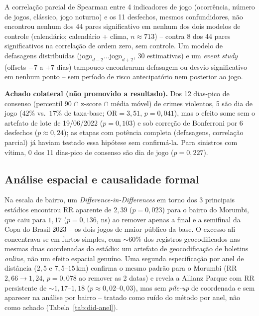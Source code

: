 \documentclass[12pt]{article}
\begin{document}
A correlação parcial de Spearman entre 4 indicadores de jogo (ocorrência,
número de jogos, clássico, jogo noturno) e os 11 desfechos, mesmos
confundidores, não encontrou nenhum dos 44 pares significativo em nenhum
dos dois modelos de controle (calendário; calendário + clima,
$n\approx713$) -- contra 8 dos 44 pares significativos na correlação de
ordem zero, sem controle. Um modelo de defasagens distribuídas
($\text{jogo}_{d-2}\ldots\text{jogo}_{d+2}$, 30 estimativas) e um
\emph{event study} (offsets $-7$ a $+7$ dias) tampouco encontraram
defasagem ou desvio significativo em nenhum ponto -- sem período de risco
antecipatório nem posterior ao jogo.

\textbf{Achado colateral (não promovido a resultado).} Dos 12 dias-pico de
consenso (percentil 90 $\cap$ z-score $\cap$ média móvel) de crimes
violentos, 5 são dia de jogo ($42\%$ vs.\ $17\%$ de taxa-base;
$\text{OR}=3,51$, $p=0,041$), mas o efeito some sem o artefato de lote de
19/06/2022 ($p=0,103$) e sob correção de Bonferroni por 6 desfechos
($p\approx0,24$); as etapas com potência completa (defasagens, correlação
parcial) já haviam testado essa hipótese sem confirmá-la. Para sinistros
com vítima, 0 dos 11 dias-pico de consenso são dia de jogo ($p=0,227$).

\subsection{Análise espacial e causalidade formal}

Na escala de bairro, um \emph{Difference-in-Differences} em torno dos 3
principais estádios encontrou RR aparente de $2,39$ ($p=0,023$) para o
bairro do Morumbi, que caiu para $1,17$ ($p=0,136$, ns) ao remover apenas
a final e a semifinal da Copa do Brasil 2023 -- os dois jogos de maior
público da base. O excesso ali concentrava-se em furtos simples, com
$\sim$60\% dos registros geocodificados nas mesmas duas coordenadas do
estádio: um artefato de geocodificação de boletins \emph{online}, não um
efeito espacial genuíno. Uma segunda especificação por anel de distância
($2,5$ e $7,5$--$15$\,km) confirma o mesmo padrão para o Morumbi (RR
$2,66\rightarrow1,24$, $p=0,078$ ao remover as 2 datas) e revela a Allianz
Parque com RR persistente de $\sim$$1,17$--$1,18$
($p\approx0,02$--$0,03$), mas sem \emph{pile-up} de coordenada e sem
aparecer na análise por bairro -- tratado como ruído do método por anel,
não como achado (Tabela~\ref{tab:did-anel}).
\end{document}
